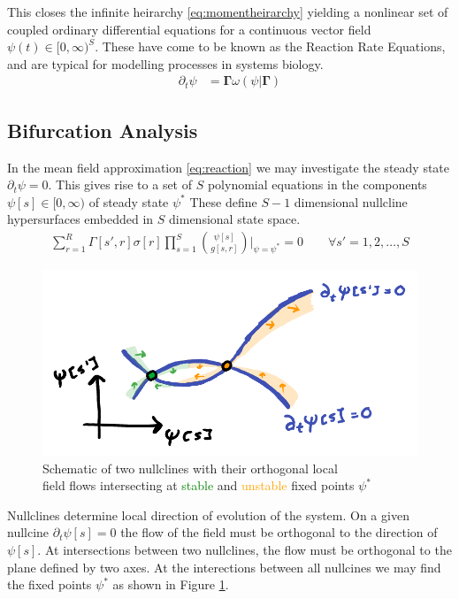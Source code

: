 This closes the infinite heirarchy
\eqref{eq:momentheirarchy} yielding a nonlinear set of coupled ordinary
differential equations for a continuous vector field $\psi(t)\in[0,\infty)^S$.
These have come to be known as the Reaction Rate Equations, and are
typical for modelling processes in systems biology.
\begin{align}
	\partial_t
	\psi &=
	\mathbf{\Gamma}\omega(\psi|\mathbf{\Gamma})
	\label{eq:reaction}
\end{align}

\subsection{Bifurcation Analysis}
In the mean field approximation \eqref{eq:reaction} we may investigate the
steady state $\partial_t\psi=0$. This gives rise to a set of $S$ polynomial
equations in the components $\psi[s]\in[0,\infty)$ of steady state $\psi^*$
These define $S-1$ dimensional nullcline hypersurfaces embedded in $S$
dimensional state space.
\begin{align}
	\sum_{r=1}^R\Gamma[s',r]\sigma[r]
		\prod_{s=1}^S{\psi[s] \choose g[s,r]}
		\bigg|_{\psi=\psi^*}
		=0\qquad\forall s'=1,2,\dots,S
	\label{eq:steadystate}
\end{align}

\begin{figure}[H]
\centering{}
\captionsetup{justification=centering}
\includegraphics[scale=0.35]{figures/nullclines}
\caption{Schematic of two nullclines with their orthogonal local\\ field flows intersecting
at \textcolor{Green}{stable} and \textcolor{orange}{unstable} fixed points $\psi^*$}
\label{fig:nullclines}
\end{figure}
Nullclines determine local direction of evolution of the system. On a given
nullcine $\partial_t\psi[s]=0$ the flow of the field must be orthogonal to
the direction of $\psi[s]$. At intersections between two nullclines, the flow
must be orthogonal to the plane defined by two axes. At the interections between
all nullcines we may find the fixed points $\psi^*$ as shown in Figure \ref{fig:nullclines}.

